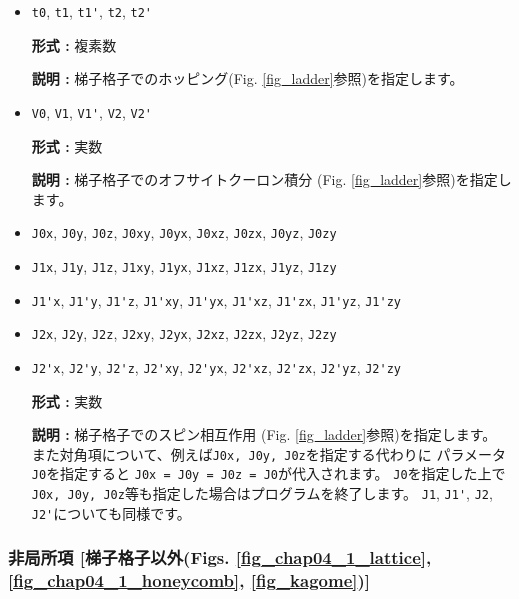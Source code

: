 \begin{itemize}
\item \verb|t0|,  \verb|t1|,  \verb|t1'|,  \verb|t2|,  \verb|t2'|

{\bf 形式 :} 複素数

{\bf 説明 :} 梯子格子でのホッピング(Fig. \ref{fig_ladder}参照)を指定します。

\item \verb|V0|,  \verb|V1|,  \verb|V1'|,  \verb|V2|,  \verb|V2'|

{\bf 形式 :} 実数

{\bf 説明 :} 梯子格子でのオフサイトクーロン積分
(Fig. \ref{fig_ladder}参照)を指定します。

\item \verb|J0x|, \verb|J0y|, \verb|J0z|, \verb|J0xy|, 
  \verb|J0yx|, \verb|J0xz|, \verb|J0zx|, \verb|J0yz|, \verb|J0zy|
\item \verb|J1x|, \verb|J1y|, \verb|J1z|, \verb|J1xy|, 
  \verb|J1yx|, \verb|J1xz|, \verb|J1zx|, \verb|J1yz|, \verb|J1zy|
\item \verb|J1'x|, \verb|J1'y|, \verb|J1'z|, \verb|J1'xy|, 
  \verb|J1'yx|, \verb|J1'xz|, \verb|J1'zx|, \verb|J1'yz|, \verb|J1'zy|
\item \verb|J2x|, \verb|J2y|, \verb|J2z|, \verb|J2xy|, 
  \verb|J2yx|, \verb|J2xz|, \verb|J2zx|, \verb|J2yz|, \verb|J2zy|
\item \verb|J2'x|, \verb|J2'y|, \verb|J2'z|, \verb|J2'xy|, 
  \verb|J2'yx|, \verb|J2'xz|, \verb|J2'zx|, \verb|J2'yz|, \verb|J2'zy|

{\bf 形式 :} 実数

{\bf 説明 :} 梯子格子でのスピン相互作用
(Fig. \ref{fig_ladder}参照)を指定します。
また対角項について、例えば\verb|J0x, J0y, J0z|を指定する代わりに
パラメータ\verb|J0|を指定すると
\verb|J0x = J0y = J0z = J0|が代入されます。
\verb|J0|を指定した上で\verb|J0x, J0y, J0z|等も指定した場合はプログラムを終了します。
\verb|J1|, \verb|J1'|, \verb|J2|, \verb|J2'|についても同様です。

\end{itemize}

\subsubsection{非局所項 [梯子格子以外(Figs. \ref{fig_chap04_1_lattice}, \ref{fig_chap04_1_honeycomb},
\ref{fig_kagome})]}

